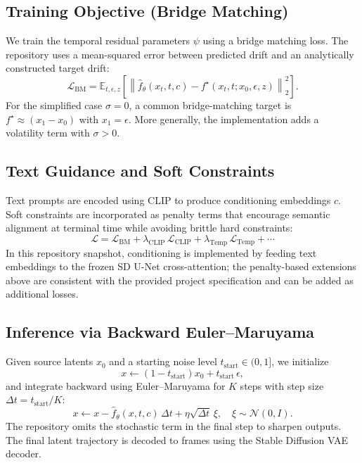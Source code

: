 \documentclass[journal]{IEEEtran}
\begin{document}
\subsection{Training Objective (Bridge Matching)}
We train the temporal residual parameters $\psi$ using a bridge matching loss. The repository uses a mean-squared error between predicted drift and an analytically constructed target drift:
\begin{equation}
\mathcal{L}_{\text{BM}} = \mathbb{E}_{t,\epsilon,z}\left[\left\|\hat{f}_{\theta}(x_t,t,c) - f^{\star}(x_t,t; x_0,\epsilon,z)\right\|_2^2\right].
\label{eq:bm_loss}
\end{equation}
For the simplified case $\sigma=0$, a common bridge-matching target is $f^{\star}\approx (x_1-x_0)$ with $x_1=\epsilon$. More generally, the implementation adds a volatility term with $\sigma>0$.

\subsection{Text Guidance and Soft Constraints}
Text prompts are encoded using CLIP to produce conditioning embeddings $c$. Soft constraints are incorporated as penalty terms that encourage semantic alignment at terminal time while avoiding brittle hard constraints:
\begin{equation}
\mathcal{L} = \mathcal{L}_{\text{BM}} + \lambda_\text{CLIP}\,\mathcal{L}_{\text{CLIP}} + \lambda_\text{Temp}\,\mathcal{L}_{\text{Temp}} + \cdots
\label{eq:full_loss}
\end{equation}
In this repository snapshot, conditioning is implemented by feeding text embeddings to the frozen SD U-Net cross-attention; the penalty-based extensions above are consistent with the provided project specification and can be added as additional losses.

\subsection{Inference via Backward Euler--Maruyama}
Given source latents $x_0$ and a starting noise level $t_\mathrm{start}\in(0,1]$, we initialize
\begin{equation}
 x \leftarrow (1-t_\mathrm{start})x_0 + t_\mathrm{start}\,\epsilon,
\end{equation}
and integrate backward using Euler--Maruyama for $K$ steps with step size $\Delta t=t_\mathrm{start}/K$:
\begin{equation}
 x \leftarrow x - \hat{f}_{\theta}(x,t,c)\,\Delta t + \eta\sqrt{\Delta t}\,\xi,\quad \xi\sim\mathcal{N}(0,I).
\label{eq:em}
\end{equation}
The repository omits the stochastic term in the final step to sharpen outputs. The final latent trajectory is decoded to frames using the Stable Diffusion VAE decoder.
\end{document}
